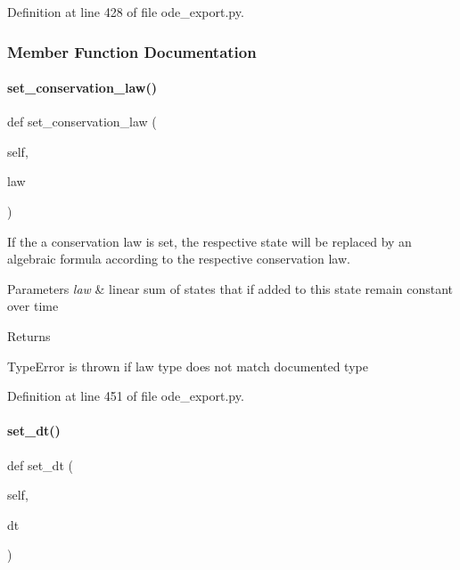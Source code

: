 Definition at line 428 of file ode\+\_\+export.\+py.



\subsubsection{Member Function Documentation}
\mbox{\label{classamici_1_1ode__export_1_1_state_a2b2539f11e691051b47456a8191aa91b}} 
\paragraph{\texorpdfstring{set\_conservation\_law()}{set\_conservation\_law()}}
{\footnotesize\ttfamily def set\+\_\+conservation\+\_\+law (\begin{DoxyParamCaption}\item[{}]{self,  }\item[{}]{law }\end{DoxyParamCaption})}

If the a conservation law is set, the respective state will be replaced by an algebraic formula according to the respective conservation law.


\begin{DoxyParams}{Parameters}
{\em law} & linear sum of states that if added to this state remain constant over time\\
\hline
\end{DoxyParams}
\begin{DoxyReturn}{Returns}

\end{DoxyReturn}
\begin{DoxyParagraph}{Type\+Error}
is thrown if law type does not match documented type 
\end{DoxyParagraph}


Definition at line 451 of file ode\+\_\+export.\+py.

\mbox{\label{classamici_1_1ode__export_1_1_state_ab241f0ff9ea890217ba44ec670c9dbbd}} 
\paragraph{\texorpdfstring{set\_dt()}{set\_dt()}}
{\footnotesize\ttfamily def set\+\_\+dt (\begin{DoxyParamCaption}\item[{}]{self,  }\item[{}]{dt }\end{DoxyParamCaption})}


